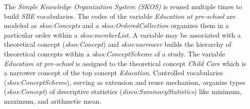 \documentclass[conference]{IEEEtran}
\begin{document}
The \emph{Simple Knowledge Organization System (SKOS)} is reused multiple times to build \emph{SBE} vocabularies.
The codes of the variable \emph{Education at pre-school} are modeled as \emph{skos:Concepts} and 
a \emph{skos:OrderedCollection} organizes them in a particular order within a \emph{skos:memberList}.
A variable may be associated with a theoretical concept (\emph{skos:Concept}) and \emph{skos:narrower} builds the hierarchy of theoretical concepts within a \emph{skos:ConceptScheme} of a study.
The variable \emph{Education at pre-school} is assigned to the theoretical concept \emph{Child Care} which is a narrower concept of the top concept \emph{Education}.
Controlled vocabularies (\emph{skos:ConceptScheme}), serving as extension and reuse mechanism,
organize types (\emph{skos:Concept}) of descriptive statistics (\emph{disco:SummaryStatistics}) like minimum, maximum, and arithmetic mean.
\end{document}
